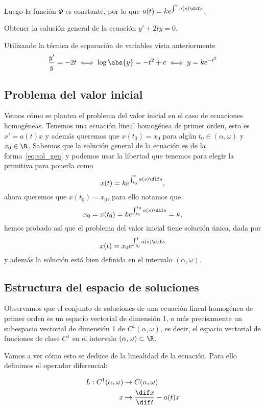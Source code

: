 \documentclass[../main.tex]{subfiles}
\begin{document}
Luego la función \(\Phi\) es constante, por lo que 
\(u(t) = k e^{\int^t a(s) \dif s}\).

\begin{example}
	Obtener la solución general de la ecuación \(y' + 2ty = 0\).
\end{example}

\begin{solution}
	Utilizando la técnica de separación de variables vista anteriormente
	\[\frac{y'}{y} = -2t \iff \log\abs{y} = -t^2 + c \iff y = k e^{-t^2}\]
\end{solution}

\subsection{Problema del valor inicial}

Vemos cómo se plantea el problema del valor inicial en el caso de ecuaciones
homogéneas. Tenemos una ecuación lineal homogénea de primer orden, esto es
\(x' = a(t)x\) y además queremos que \(x(t_0) = x_0\) para algún 
\(t_0 \in (\alpha, \omega)\) y \(x_0 \in \R\). 
Sabemos que la solución general de la ecuación es de la forma~\eqref{eq:sol_gen}
y podemos usar la libertad que tenemos para elegir la primitiva para ponerla como
\[x(t) = k e^{\int_{t_0}^t a(s) \dif s},\]
ahora queremos que \(x(t_0) = x_0\), para ello notamos que
\[x_0 = x(t_0) = k e^{\int_{t_0}^{t_0} a(s) \dif s} = k,\]
hemos probado así que el problema del valor inicial tiene solución única, 
dada por
\[x(t) = x_0 e^{\int_{t_0}^t a(s) \dif s}\]
y además la solución está bien definida en el intervalo \((\alpha, \omega)\).

\subsection{Estructura del espacio de soluciones}

Observamos que el conjunto de soluciones de una ecuación lineal homogénea de
primer orden es un espacio vectorial de dimensión 1, o más precisamente un
subespacio vectorial de dimensión 1 de \(C^1(\alpha, \omega)\), es decir, el
espacio vectorial de funciones de clase \(C^1\) en el intervalo
\((\alpha, \omega) \subset \R\).

Vamos a ver cómo esto se deduce de la linealidad de la ecuación. Para ello
definimos el operador diferencial:

\begin{align*}
  L : C^1(\alpha, \omega) &\to C(\alpha, \omega) \\
  x &\mapsto \frac{\dif x}{\dif t} - a(t)x
\end{align*}
\end{document}
